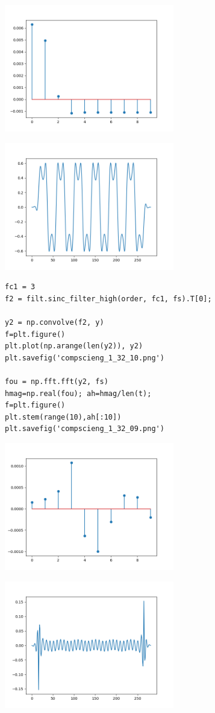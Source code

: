 \documentclass[12pt,fleqn]{article}\usepackage{../../common}
\begin{document}
\includegraphics[width=20em]{compscieng_1_32_07.png}

\includegraphics[width=20em]{compscieng_1_32_08.png}


\begin{verbatim}
fc1 = 3
f2 = filt.sinc_filter_high(order, fc1, fs).T[0];

y2 = np.convolve(f2, y)
f=plt.figure()
plt.plot(np.arange(len(y2)), y2)
plt.savefig('compscieng_1_32_10.png')

fou = np.fft.fft(y2, fs)
hmag=np.real(fou); ah=hmag/len(t);
f=plt.figure()
plt.stem(range(10),ah[:10])
plt.savefig('compscieng_1_32_09.png')
\end{verbatim}

\includegraphics[width=20em]{compscieng_1_32_09.png}

\includegraphics[width=20em]{compscieng_1_32_10.png}
\end{document}
